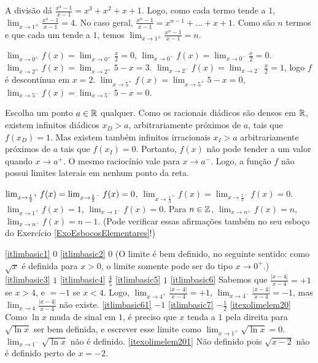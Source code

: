 \begin{Solution}{4.11}
 A divisão dá $\frac{x^4-1}{x-1}=x^3+x^2+x+1$. Logo, como cada termo tende a $1$,
$\lim_{x\to 1^{\pm}}\frac{x^4-1}{x-1}=4$.
 No caso geral, $\frac{x^n-1}{x-1}=x^{n-1}+\dots+x+1$. Como são $n$ termos e que cada um
tende a $1$, temos $\lim_{x\to 1^{\pm}}\frac{x^n-1}{x-1}=n$.
\end{Solution}
\begin{Solution}{4.12}
$\lim_{x\to 0^+}f(x)=\lim_{x\to 0^+}\frac{x}{2}=0$,
$\lim_{x\to 0^-}f(x)=\lim_{x\to 0^-}\frac{x}{2}=0$.
$\lim_{x\to 2^+}f(x)=\lim_{x\to 2^+}5-x=3$.
$\lim_{x\to 2^-}f(x)=\lim_{x\to 2^-}\frac{x}{2}=1$, logo $f$ é descontínua em
$x=2$.
$\lim_{x\to 5^+}f(x)=\lim_{x\to 5^+}5-x=0$,
$\lim_{x\to 5^-}f(x)=\lim_{x\to 5^-}5-x=0$.
\end{Solution}
\begin{Solution}{4.13}
Escolha um ponto $a\in \mathbb{R}$ qualquer.
Como os racionais diádicos 
são densos em $\mathbb{R}$, existem infinitos diádicos $x_D>a$,
 arbitrariamente próximos de $a$, tais que $f(x_D)=1$. Mas existem também infinitos
irracionais $x_I>a$ arbitrariamente próximos de $a$ tais que $f(x_I)=0$. Portanto, $f(x)$
não pode tender a um valor quando $x\to a^+$. O mesmo raciocínio vale para $x\to a^-$.
Logo, a função $f$ não possui limites laterais em nenhum ponto da reta.
\end{Solution}
\begin{Solution}{4.14}
$\lim_{x\to \frac{1}{2}^+}f(x)=\lim_{x\to \frac{1}{2}^-}f(x)=0$,
$\lim_{x\to \frac{1}{3}^+}f(x)=\lim_{x\to \frac{1}{3}^-}f(x)=0$.
$\lim_{x\to 1^+}f(x)=1$, $\lim_{x\to 1^-}f(x)=0$. Para
$n\in \mathbb{Z}$, $\lim_{x\to n^+}f(x)=n$, $\lim_{x\to n^-}f(x)=n-1$.
(Pode verificar essas afirmações também no seu esboço do
Exercício \ref{ExoEsbocosElementares}!)
\end{Solution}
\begin{Solution}{4.15}
\eqref{itlimbasic1} $0$
\eqref{itlimbasic2} $0$ (O limite é bem definido, no seguinte
sentido: como $\sqrt{x}$ é definida para $x>0$, o limite
somente pode ser do tipo $x\to 0^+$.)
\eqref{itlimbasic3} $1$
\eqref{itlimbasic4} $\frac45$
\eqref{itlimbasic5} $1$
\eqref{itlimbasic6} Sabemos que $\frac{|x-4|}{x-4}=+1$ se $x>4$, e
$=-1$ se $x<4$. Logo, $\lim_{x\to 4^+}\frac{|x-4|}{x-4}=+1$,
$\lim_{x\to 4^-}\frac{|x-4|}{x-4}=-1$, mas $\lim_{x\to
4}\frac{|x-4|}{x-4}$ não existe.
\eqref{itlimbasic61} $-1$
\eqref{itlimbasic7} $-\frac12$
\eqref{itexolimelem20} Como $\ln x$ muda de sinal em $1$, é preciso
que $x$ tenda a $1$ pela direita para $\sqrt{\ln x}$ ser bem definida,
e escrever esse limite como $\lim_{x\to 1^+}\sqrt{\ln x}=0$.
$\lim_{x\to 1^-}\sqrt{\ln x}$ não é definido.
\eqref{itexolimelem201} Não definido pois $\sqrt{x-2}$ não é definido perto de $x=-2$.
\end{Solution}
